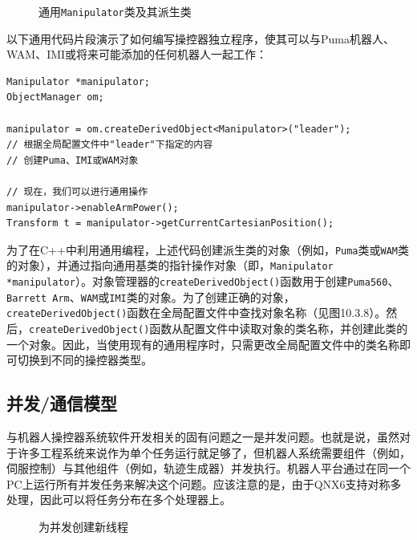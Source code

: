 \documentclass[UTF8,a4paper,12pt]{ctexart}
\begin{document}
\begin{figure}[htbp]
\centering
{}
\caption{通用\texttt{Manipulator}类及其派生类}
\label{fig:10.3.9}
\end{figure}

以下通用代码片段演示了如何编写操控器独立程序，使其可以与Puma机器人、WAM、IMI或将来可能添加的任何机器人一起工作：

\begin{lstlisting}[caption={通用操控器编程示例}]
Manipulator *manipulator;
ObjectManager om;

manipulator = om.createDerivedObject<Manipulator>("leader");
// 根据全局配置文件中"leader"下指定的内容
// 创建Puma、IMI或WAM对象

// 现在，我们可以进行通用操作
manipulator->enableArmPower();
Transform t = manipulator->getCurrentCartesianPosition();
\end{lstlisting}

为了在C++中利用通用编程，上述代码创建派生类的对象（例如，\texttt{Puma}类或\texttt{WAM}类的对象），并通过指向通用基类的指针操作对象（即，\texttt{Manipulator *manipulator}）。对象管理器的\texttt{createDerivedObject()}函数用于创建\texttt{Puma560}、\texttt{Barrett Arm}、\texttt{WAM}或\texttt{IMI}类的对象。为了创建正确的对象，\texttt{createDerivedObject()}函数在全局配置文件中查找对象名称（见图10.3.8）。然后，\texttt{createDerivedObject()}函数从配置文件中读取对象的类名称，并创建此类的一个对象。因此，当使用现有的通用程序时，只需更改全局配置文件中的类名称即可切换到不同的操控器类型。

\subsection{并发/通信模型}

与机器人操控器系统软件开发相关的固有问题之一是并发问题。也就是说，虽然对于许多工程系统来说作为单个任务运行就足够了，但机器人系统需要组件（例如，伺服控制）与其他组件（例如，轨迹生成器）并发执行。机器人平台通过在同一个PC上运行所有并发任务来解决这个问题。应该注意的是，由于QNX6支持对称多处理，因此可以将任务分布在多个处理器上。

\begin{figure}[htbp]
\centering
{}
\caption{为并发创建新线程}
\label{fig:10.3.10}
\end{figure}
\end{document}
